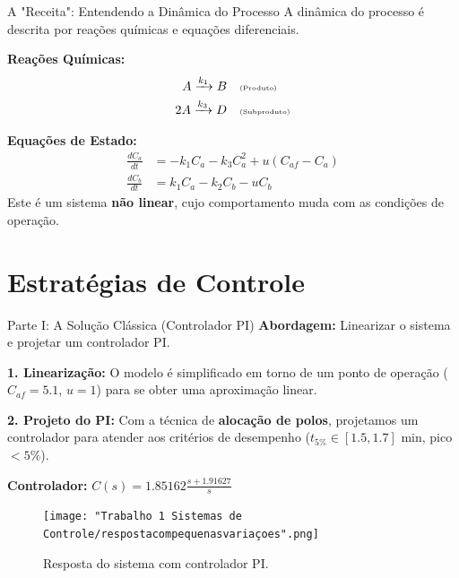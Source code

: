 \documentclass{beamer}
\begin{document}
\begin{frame}{A "Receita": Entendendo a Dinâmica do Processo}
    \small
    A dinâmica do processo é descrita por reações químicas e equações diferenciais.
    
    \textbf{Reações Químicas:}
    \begin{align*}
        A \xrightarrow{k_1} B & \quad \text{\tiny (Produto)} \\
        2A \xrightarrow{k_3} D & \quad \text{\tiny (Subproduto)}
    \end{align*}
    
    \textbf{Equações de Estado:}
    \tiny
    \begin{align*}
    \frac{dC_a}{dt} &= -k_1 C_a - k_3 C_a^2 + u(C_{af} - C_a) \\
    \frac{dC_b}{dt} &= k_1 C_a - k_2 C_b - u C_b
    \end{align*}
    \normalsize
    Este é um sistema \textbf{não linear}, cujo comportamento muda com as condições de operação.
    
\end{frame}

\section{Estratégias de Controle}

\begin{frame}{Parte I: A Solução Clássica (Controlador PI)}
    \large \textbf{Abordagem:} Linearizar o sistema e projetar um controlador PI.
    \vspace{0.5em}
    
    \small
    \textbf{1. Linearização:} O modelo é simplificado em torno de um ponto de operação (\(C_{af}=5.1\), \(u=1\)) para se obter uma aproximação linear.
    
    \textbf{2. Projeto do PI:} Com a técnica de \textbf{alocação de polos}, projetamos um controlador para atender aos critérios de desempenho (\(t_{5\%} \in [1.5, 1.7]\) min, pico \(< 5\%\)).
    
    \textbf{Controlador:} \tiny \( C(s) = 1.85162 \frac{s + 1.91627}{s} \)
    
    \begin{figure}
        \centering
        \texttt{[image: "Trabalho 1 Sistemas de Controle/respostacompequenasvariaçoes".png]}
        \caption{\tiny Resposta do sistema com controlador PI.}
    \end{figure}
    
\end{frame}
\end{document}
